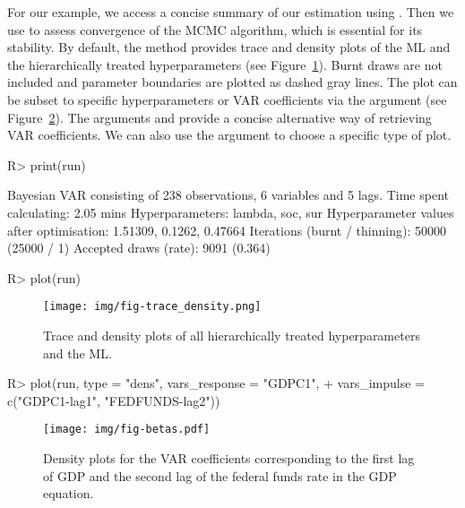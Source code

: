 \documentclass[article,nojss]{jss} %
\begin{document}
For our example, we access a concise summary of our estimation using . Then we use  to assess convergence of the MCMC algorithm, which is essential for its stability. By default, the method provides trace and density plots of the ML and the hierarchically treated hyperparameters (see Figure~\ref{fig:trace_density}). Burnt draws are not included and parameter boundaries are plotted as dashed gray lines.
The plot can be subset to specific hyperparameters or VAR coefficients via the  argument (see Figure~\ref{fig:betas}). The arguments  and  provide a concise alternative way of retrieving VAR coefficients. We can also use the  argument to choose a specific type of plot.

\begin{Schunk}
\begin{Sinput}
R> print(run)
\end{Sinput}
\begin{Soutput}
Bayesian VAR consisting of 238 observations, 6 variables and 5 lags.
Time spent calculating: 2.05 mins
Hyperparameters: lambda, soc, sur 
Hyperparameter values after optimisation: 1.51309, 0.1262, 0.47664
Iterations (burnt / thinning): 50000 (25000 / 1)
Accepted draws (rate): 9091 (0.364)
\end{Soutput}
\end{Schunk}

\begin{Schunk}
\begin{Sinput}
R> plot(run)
\end{Sinput}
\end{Schunk}

\begin{figure}[!ht]
	\centering
  \texttt{[image: img/fig-trace\_density.png]}
	\caption{Trace and density plots of all hierarchically treated hyperparameters and the ML.}
	\label{fig:trace_density}
\end{figure}

\begin{Schunk}
\begin{Sinput}
R> plot(run, type = "dens", vars_response = "GDPC1",
+    vars_impulse = c("GDPC1-lag1", "FEDFUNDS-lag2"))
\end{Sinput}
\end{Schunk}

\begin{figure}[!ht]
	\centering
  \texttt{[image: img/fig-betas.pdf]}
	\caption{Density plots for the VAR coefficients corresponding to the first lag of GDP and the second lag of the federal funds rate in the GDP equation.}
	\label{fig:betas}
\end{figure}
\end{document}
